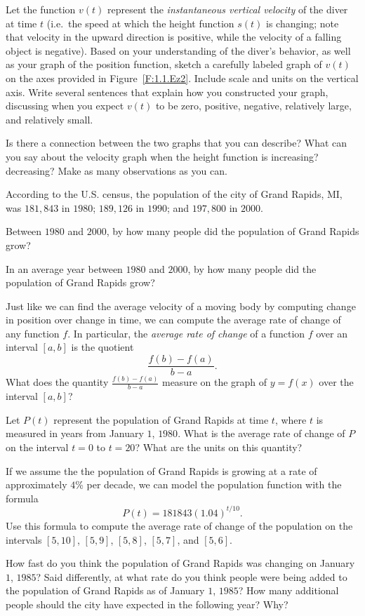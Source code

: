 \begin{exercises}
  \item Let the function $v(t)$ represent the \emph{instantaneous vertical velocity} of the diver at time $t$ (i.e.~the speed at which the height function $s(t)$ is changing; note that velocity in the upward direction is positive, while the velocity of a falling object is negative).  Based on your understanding of the diver's behavior, as well as your graph of the position function, sketch a carefully labeled graph of $v(t)$ on the axes provided  in Figure~\ref{F:1.1.Ez2}.  Include scale and units on the vertical axis.  Write several sentences that explain how you constructed your graph, discussing when you expect $v(t)$ to be zero, positive, negative, relatively large, and relatively small.
  \item Is there a connection between the two graphs that you can describe?  What can you say about the velocity graph when the height function is increasing?  decreasing?  Make as many observations as you can.
\ea
\begin{exerciseSolution}
\end{exerciseSolution}

\item According to the U.S. census, the population of the city of Grand Rapids, MI, was $181,843$ in $1980$; $189,126$ in $1990$; and $197,800$ in $2000$.

\ba
	\item Between $1980$ and $2000$, by how many people did the population of Grand Rapids grow?
	\item In an average year between $1980$ and $2000$, by how many people did the population of Grand Rapids grow?
	\item Just like we can find the average velocity of a moving body by computing change in position over change in time, we can compute the average rate of change of any function $f$.  In particular, the \emph{average rate of change} of a function $f$ over an interval $[a,b]$ is the quotient
$$\frac{f(b)-f(a)}{b-a}.$$  
What does the quantity $\frac{f(b)-f(a)}{b-a}$ measure on the graph of $y = f(x)$ over the interval $[a,b]$?
	\item Let $P(t)$ represent the population of Grand Rapids at time $t$, where $t$ is measured in years from January $1$, $1980$.  What is the average rate of change of $P$ on the interval $t = 0$ to $t = 20$?  What are the units on this quantity?
	\item If we assume the the population of Grand Rapids is growing at a rate of approximately $4$\% per decade,  we can model the population function with the formula $$P(t) = 181843 (1.04)^{t/10}.$$  Use this formula to compute the average rate of change of the population on the intervals $[5,10]$, $[5,9]$, $[5,8]$, $[5,7]$, and $[5,6]$.
	\item How fast do you think the population of Grand Rapids was changing on January $1$, $1985$?  Said differently, at what rate do you think people were being added to the population of Grand Rapids as of January $1$, $1985$?  How many additional people should the city have expected in the following year?  Why?
\ea

\end{exercises}
\afterexercises
